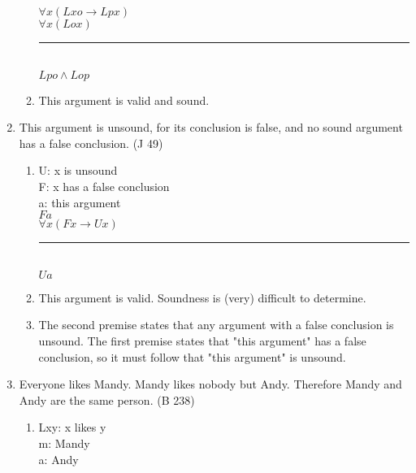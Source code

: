 \documentclass{article}
\begin{document}
\begin{enumerate}
\begin{enumerate}
                        $\forall x(Lxo \to Lpx)$\\
                        $\forall x(Lox)$\\
                        \rule{15em}{.5pt}\\
                        $Lpo \land Lop$
                  \item This argument is valid and sound.
            \end{enumerate}
      \item This argument is unsound, for its conclusion is false, and no sound argument has a false conclusion. (J 49)
            \begin{enumerate}
                  \item U: x is unsound\\
                        F: x has a false conclusion\\
                        a: this argument\\

                        $Fa$\\
                        $\forall x(Fx \to Ux)$\\
                        \rule{15em}{.5pt}\\
                        $Ua$
                  \item This argument is valid. Soundness is (very) difficult to determine.
                  \item The second premise states that any argument with a false conclusion is unsound. The first premise states that "this argument" has a false conclusion, so it must follow that "this argument" is unsound.
            \end{enumerate}
      \item Everyone likes Mandy. Mandy likes nobody but Andy. Therefore Mandy and Andy are the same person. (B 238)
            \begin{enumerate}
                  \item Lxy: x likes y\\
                        m: Mandy\\
                        a: Andy\\


\end{enumerate}
\end{enumerate}
\end{document}

